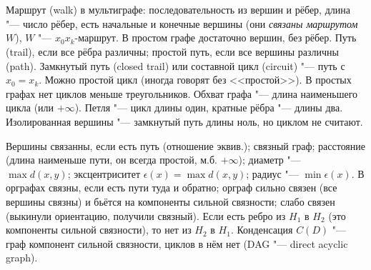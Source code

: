 \section{} %
Маршрут (walk) в мультиграфе: последовательность из вершин и рёбер, длина "--- число рёбер, есть начальные и конечные вершины
(они \textit{связаны маршрутом $W$}), $W$ "--- $x_0x_k$-маршрут.
В простом графе достаточно вершин, без рёбер.
Путь (trail), если все рёбра различны; простой путь, если все вершины различны (path).
Замкнутый путь (closed trail) или составной цикл (circuit) "--- путь с $x_0=x_k$.
Можно простой цикл (иногда говорят без <<простой>>).
В простых графах нет циклов меньше треугольников.
Обхват графа "--- длина наименьшего цикла (или $+\infty$).
Петля "--- цикл длины один, кратные рёбра "--- длины два.
Изолированная вершины "--- замкнутый путь длины ноль, но циклом не считают.

Вершины связанны, если есть путь (отношение эквив.); связный граф;
расстояние (длина наименьше пути, он всегда простой, м.б. $+\infty$);
диаметр "--- $\max d(x, y)$;
эксцентриситет $\epsilon(x) = \max d(x, y)$;
радиус "--- $\min \epsilon(x)$.
В орграфах связны, если есть пути туда и обратно; орграф сильно связен (все вершины связны) и бьётся на компоненты
сильной связности; слабо связен (выкинули ориентацию, получили связный).
Если есть ребро из $H_1$ в $H_2$ (это компоненты сильной связности), то нет из $H_2$ в $H_1$.
Конденсация $C(D)$ "--- граф компонент сильной связности, циклов в нём нет (DAG "--- direct acyclic graph).

\section{} %

\section{} %

